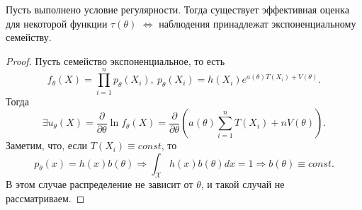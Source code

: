\begin{proposition}
Пусть выполнено условие регулярности. Тогда существует эффективная оценка для некоторой функции $\displaystyle \tau ( \theta )$ $\displaystyle \Leftrightarrow $ наблюдения принадлежат экспоненциальному семейству.
\end{proposition}
\begin{proof}
Пусть семейство экспоненциальное, то есть
\begin{equation*}
f_{\theta }( X) =\prod _{i=1}^{n} p_{\theta }( X_{i}) ,\ p_{\theta }( X_{i}) =h( X_{i}) e^{a( \theta ) T( X_{i}) +V( \theta )} .
\end{equation*}
Тогда 
\begin{equation*}
\exists u_{\theta }( X) =\frac{\partial }{\partial \theta }\ln f_{\theta }( X) =\frac{\partial }{\partial \theta }\left( a( \theta )\sum _{i=1}^{n} T( X_{i}) +nV( \theta )\right) .
\end{equation*}
Заметим, что, если $\displaystyle T( X_{i}) \equiv const$, то
\begin{equation*}
p_{\theta }( x) =h( x) b( \theta ) \Rightarrow \int _{\mathcal{X}} h( x) b( \theta ) dx=1\Rightarrow b( \theta ) \equiv const.
\end{equation*}
В этом случае распределение не зависит от $\displaystyle \theta $, и такой случай не рассматриваем.


\end{proof}
